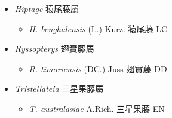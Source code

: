 
  \begin{itemize}
 \item[] \textit{Hiptage} 猿尾藤屬
                                
  \begin{itemize}
        \item[] \href{http://www.theplantlist.org/tpl1.1/search?q=Hiptage+benghalensis}{\textit{H. benghalensis} (L.) Kurz.}   猿尾藤   LC
  \end{itemize}
 \item[] \textit{Ryssopterys} 翅實藤屬
                                
  \begin{itemize}
        \item[] \href{http://www.theplantlist.org/tpl1.1/search?q=Ryssopterys+timoriensis}{\textit{R. timoriensis} (DC.) Juss}   翅實藤   DD
  \end{itemize}
 \item[] \textit{Tristellateia} 三星果藤屬
                                
  \begin{itemize}
        \item[] \href{http://www.theplantlist.org/tpl1.1/search?q=Tristellateia+australasiae}{\textit{T. australasiae} A.Rich.}   三星果藤   EN
  \end{itemize}
  \end{itemize}
